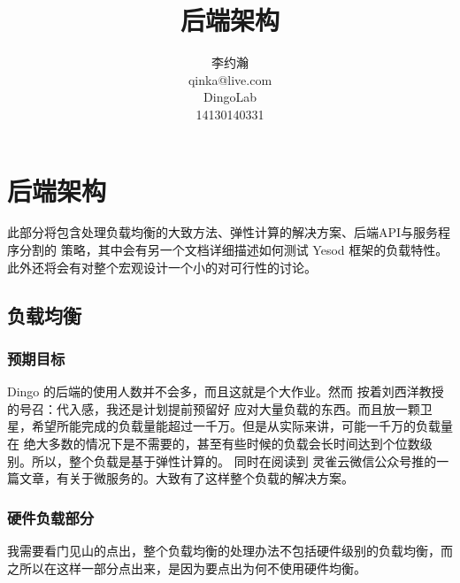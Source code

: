 







\makeatletter
\def\@NoStyleChaper{\ralex} %
\def\@ARCHDoc{\ralex} %
\def\@UsingAppendix{\ralex} %
\def\@DocType{article}
\def\@DocTypeCTEX{ctexart}
\def\primarykey#1{\colorbox[rgb]{0.9,0.7,0.65}{#1}}
\makeatother


\title{后端架构}
\author{李约瀚 \\ qinka@live.com \\ DingoLab \\ 14130140331}


\maketitle
\newpage

\section{后端架构}

此部分将包含处理负载均衡的大致方法、弹性计算的解决方案、后端API与服务程序分割的
策略，其中会有另一个文档详细描述如何测试 Yesod 框架的负载特性。
此外还将会有对整个宏观设计一个小的对可行性的讨论。


\subsection{负载均衡}
\subsubsection{预期目标}
Dingo 的后端的使用人数并不会多，而且这就是个大作业。然而 按着刘西洋教授的号召：代入感，我还是计划提前预留好
应对大量负载的东西。而且放一颗卫星，希望所能完成的负载量能超过一千万。但是从实际来讲，可能一千万的负载量在
绝大多数的情况下是不需要的，甚至有些时候的负载会长时间达到个位数级别。所以，整个负载是基于弹性计算的。
同时在阅读到 灵雀云微信公众号推的一篇文章，有关于微服务的。大致有了这样整个负载的解决方案。
\subsubsection{硬件负载部分}
我需要看门见山的点出，整个负载均衡的处理办法不包括硬件级别的负载均衡，而之所以在这样一部分点出来，是因为要点出为何不使用硬件均衡。


